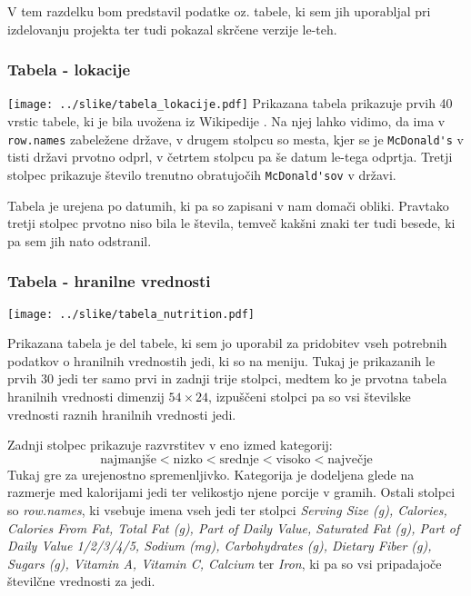\documentclass[hidelinks, 11pt,a4paper]{article}
\begin{document}
V tem razdelku bom predstavil podatke oz. tabele, ki sem jih uporabljal pri izdelovanju projekta ter tudi pokazal skrčene verzije le-teh.

\newpage
\subsubsection{Tabela - lokacije}
\vspace{5mm}
\texttt{[image: ../slike/tabela\_lokacije.pdf]}
\noindent
Prikazana tabela prikazuje prvih 40 vrstic tabele, ki je bila uvožena iz Wikipedije \cite{bib:drzave}. Na njej lahko vidimo, da ima v \verb|row.names| zabeležene države, v drugem stolpcu so mesta, kjer se je \verb|McDonald's| v tisti državi prvotno odprl, v četrtem stolpcu pa še datum le-tega odprtja. Tretji stolpec prikazuje število trenutno obratujočih \verb|McDonald'sov| v državi. \par

Tabela je urejena po datumih, ki pa so zapisani v nam domači obliki. Pravtako tretji stolpec prvotno niso bila le števila, temveč kakšni znaki ter tudi besede, ki pa sem jih nato odstranil.

\subsubsection{Tabela - hranilne vrednosti}
\vspace{5mm}
\texttt{[image: ../slike/tabela\_nutrition.pdf]}

\noindent
Prikazana tabela je del tabele, ki sem jo uporabil za pridobitev vseh potrebnih podatkov o hranilnih vrednostih jedi, ki so na meniju. Tukaj je prikazanih le prvih 30 jedi ter samo prvi in zadnji trije stolpci, medtem ko je prvotna tabela hranilnih vrednosti dimenzij $54\times24$, izpuščeni stolpci pa so vsi številske vrednosti raznih hranilnih vrednosti jedi. \par

Zadnji stolpec prikazuje razvrstitev v eno izmed kategorij: $$\mbox{najmanjše} < \mbox{nizko} < \mbox{srednje} < \mbox{visoko} < \mbox{največje}$$
Tukaj gre za urejenostno spremenljivko. Kategorija je dodeljena glede na razmerje med kalorijami jedi ter velikostjo njene porcije v gramih.
Ostali stolpci so \textit{row.names}, ki vsebuje imena vseh jedi ter stolpci \textit{Serving Size (g), Calories, Calories From Fat, Total Fat (g), Part of Daily Value, Saturated Fat (g), Part of Daily Value 1/2/3/4/5, Sodium (mg), Carbohydrates (g), Dietary Fiber (g), Sugars (g), Vitamin A, Vitamin C, Calcium} ter \textit{Iron}, ki pa so vsi pripadajoče številčne vrednosti za jedi.
\end{document}
